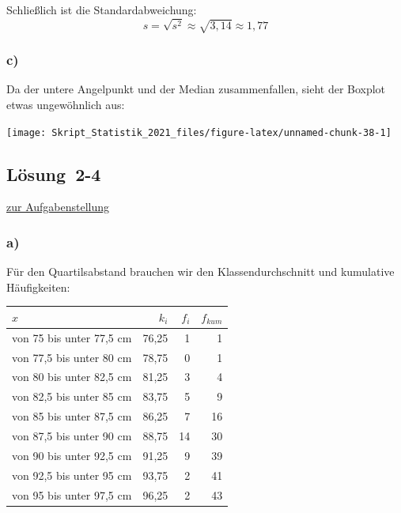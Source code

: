 \documentclass[
  11pt,
  ngerman,
  a4paper,
]{report}
\begin{document}
Schließlich ist die Standardabweichung: \[s=\sqrt{s^2}\approx\sqrt{3,14}\approx1,77\]

\hypertarget{c-4}{%
\subsubsection{c)}\label{c-4}}

Da der untere Angelpunkt und der Median zusammenfallen, sieht der Boxplot etwas ungewöhnlich aus:

\begin{center}\texttt{[image: Skript\_Statistik\_2021\_files/figure-latex/unnamed-chunk-38-1]} \end{center}

\hypertarget{loesung-2-4}{%
\subsection{Lösung~2-4}\label{loesung-2-4}}

\protect\hyperlink{aufgabe-2-4}{zur Aufgabenstellung}

\hypertarget{a-5}{%
\subsubsection{a)}\label{a-5}}

Für den Quartilsabstand brauchen wir den Klassendurchschnitt und kumulative Häufigkeiten:

\begin{table}[H]
\centering
\begin{tabular}{lrrr}
\toprule
$x$ & $k_i$ & $f_i$ & $f_{kum}$\\
\midrule
von 75 bis unter 77,5 cm & 76,25 & 1 & 1\\
von 77,5 bis unter 80 cm & 78,75 & 0 & 1\\
von 80 bis unter 82,5 cm & 81,25 & 3 & 4\\
von 82,5 bis unter 85 cm & 83,75 & 5 & 9\\
von 85 bis unter 87,5 cm & 86,25 & 7 & 16\\
von 87,5 bis unter 90 cm & 88,75 & 14 & 30\\
von 90 bis unter 92,5 cm & 91,25 & 9 & 39\\
von 92,5 bis unter 95 cm & 93,75 & 2 & 41\\
von 95 bis unter 97,5 cm & 96,25 & 2 & 43\\
\bottomrule
\end{tabular}
\end{table}
\end{document}
